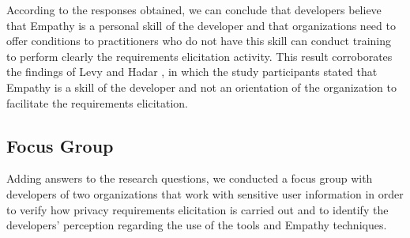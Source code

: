 \documentclass[conference]{IEEEtran}
\begin{document}

According to the responses obtained, we can conclude that developers believe that Empathy is a personal skill of the developer and that organizations need to offer conditions to practitioners who do not have this skill can conduct training to perform clearly the requirements elicitation activity. This result corroborates the findings of Levy and Hadar \cite{DBLP:conf/re/LevyH18}, in which the study participants stated that Empathy is a skill of the developer and not an orientation of the organization to facilitate the requirements elicitation.

\subsection{Focus Group}


Adding answers to the research questions, we conducted a focus group with developers of two organizations that work with sensitive user information in order to verify how privacy requirements elicitation is carried out and to identify the developers' perception regarding the use of the tools and Empathy techniques.

\end{document}

